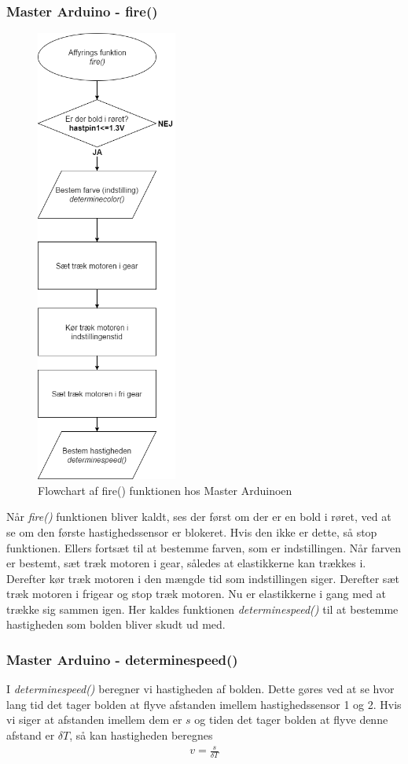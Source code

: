 \subsubsection{Master Arduino - fire()}
\begin{figure}[H]
	\centering
    \includegraphics[height=15cm]{figures/arduino/M-fire.PNG}
	\caption{Flowchart af fire() funktionen hos Master Arduinoen}
	\label{flow:fire}
\end{figure}
Når \textit{fire()} funktionen bliver kaldt, ses der først om der er en bold i røret, ved at se om den første hastighedssensor er blokeret. Hvis den ikke er dette, så stop funktionen. Ellers fortsæt til at bestemme farven, som er indstillingen. Når farven er bestemt, sæt træk motoren i gear, således at elastikkerne kan trækkes i. Derefter kør træk motoren i den mængde tid som indstillingen siger. Derefter sæt træk motoren i frigear og stop træk motoren. Nu er elastikkerne i gang med at trække sig sammen igen. Her kaldes funktionen \textit{determinespeed()} til at bestemme hastigheden som bolden bliver skudt ud med.

\subsubsection{Master Arduino - determinespeed()}
I \textit{determinespeed()} beregner vi hastigheden af bolden. Dette gøres ved at se hvor lang tid det tager bolden at flyve afstanden imellem hastighedssensor 1 og 2. Hvis vi siger at afstanden imellem dem er $s$ og tiden det tager bolden at flyve denne afstand er $\delta T$, så kan hastigheden beregnes
\begin{align}
v=\frac{s}{\delta T}
\end{align}

